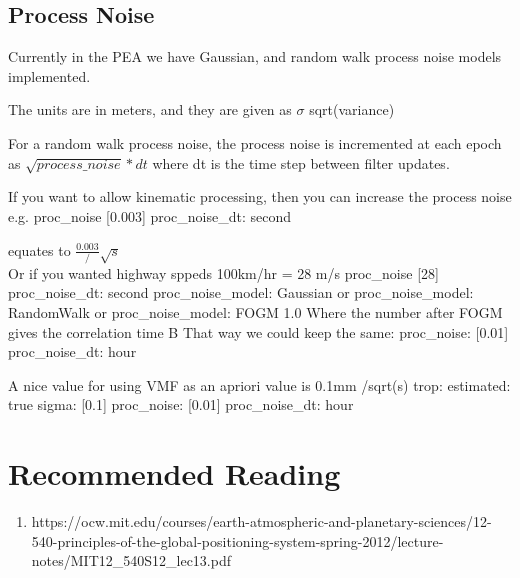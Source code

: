

\subsection{Process Noise}

Currently in the PEA we have Gaussian, and random walk process noise models implemented.

The units are in meters, and they are given as $\sigma$ sqrt(variance)

For a random walk process noise, the process noise is incremented at each epoch as $\sqrt{process\_noise}*dt$ where dt is the time step between filter updates.

If you want to allow kinematic processing, then you can increase the process noise e.g.
proc\_noise [0.003]
proc\_noise\_dt: second 

equates to $\frac{0.003}/\sqrt{s}$
\\ 
Or if you wanted highway sppeds 100km/hr = 28 m/s
proc\_noise [28]
proc\_noise\_dt: second
proc\_noise\_model:   Gaussian
or
         proc\_noise\_model:   RandomWalk
or
         proc\_noise\_model:   FOGM 1.0
Where the number after FOGM gives the correlation time B
That way we could keep the same:
            proc\_noise:         [0.01]
            proc\_noise\_dt:      hour

A nice value for using VMF as an apriori value is 0.1mm /sqrt(s)
trop:
            estimated:          true
            sigma:              [0.1]
            proc_noise:         [0.01]
            proc_noise_dt:      hour

\section{Recommended Reading}

\begin{enumerate}
    \item https://ocw.mit.edu/courses/earth-atmospheric-and-planetary-sciences/12-540-principles-of-the-global-positioning-system-spring-2012/lecture-notes/MIT12\_540S12\_lec13.pdf
\end{enumerate}

